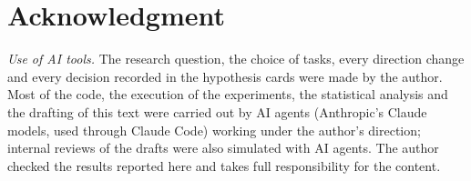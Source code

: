 \documentclass[conference]{IEEEtran}
\begin{document}









\section*{Acknowledgment}
\emph{Use of AI tools.} The research question, the choice of tasks, every direction change and every decision recorded in the hypothesis cards were made by the author. Most of the code, the execution of the experiments, the statistical analysis and the drafting of this text were carried out by AI agents (Anthropic's Claude models, used through Claude Code) working under the author's direction; internal reviews of the drafts were also simulated with AI agents. The author checked the results reported here and takes full responsibility for the content.




\clearpage
\onecolumn
\appendices

\end{document}
